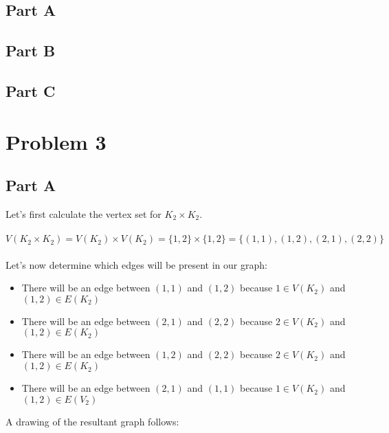 \documentclass{article}%
\begin{document}
\subsection{Part A}
\subsection{Part B}
\subsection{Part C}

\section{Problem 3}

\subsection{Part A}

Let's first calculate the vertex set for $K_2 \times K_2$.\\ \\
$V(K_2 \times K_2) = V(K_2) \times V(K_2) = \{1, 2\} \times \{1, 2\} = \{(1, 1), (1, 2), (2, 1), (2, 2)\}$ \\ \\
Let's now determine which edges will be present in our graph:
\begin{itemize}
    \item There will be an edge between $(1, 1)$ and $(1, 2)$ because $1 \in V(K_2)$ and $(1,2) \in E(K_2)$
    \item There will be an edge between $(2, 1)$ and $(2, 2)$ because $2 \in V(K_2)$ and $(1,2) \in E(K_2)$
    \item There will be an edge between $(1, 2)$ and $(2, 2)$ because $2 \in V(K_2)$ and $(1,2) \in E(K_2)$
    \item There will be an edge between $(2, 1)$ and $(1, 1)$ because $1 \in V(K_2)$ and $(1,2) \in E(V_2)$
\end{itemize}

A drawing of the resultant graph follows:

 \\
\end{document}
